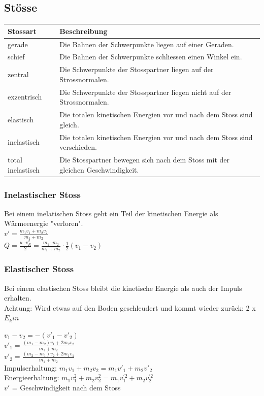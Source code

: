 \subsection{Stösse}

\begin{tabular}[c]{|l|l|}
	\hline
	Stossart & Beschreibung \\
	\hline
	gerade & Die Bahnen der Schwerpunkte liegen auf einer Geraden. \\
	\hline
	schief & Die Bahnen der Schwerpunkte schliessen einen Winkel ein. \\
	\hline
	zentral & Die Schwerpunkte der Stosspartner liegen auf der Strossnormalen.  \\
	\hline
	exzentrisch & Die Schwerpunkte der Stosspartner liegen nicht auf der Strossnormalen.  \\
	\hline
	elastisch & Die totalen kinetischen Energien vor und nach dem Stoss sind gleich.  \\
		\hline
	inelastisch & Die totalen kinetischen Energien vor und nach dem Stoss sind verschieden.  \\
	\hline
	total inelastisch & Die Stosspartner bewegen sich nach dem Stoss mit der gleichen Geschwindigkeit.  \\
	\hline
\end{tabular}

%

\subsubsection{Inelastischer Stoss}
Bei einem inelatischen Stoss geht ein Teil der kinetischen Energie als Wärmeenergie "verloren". \\
$v' = \frac{m_1v_1 + m_2v_2}{m_1 + m_2}$ \\
$Q = \frac{u \cdot v_{R}^2}{2} = \frac{m_1 \cdot m_2}{m_1 + m_2} \cdot \frac{1}{2}(v_1 - v_2) $

\subsubsection{Elastischer Stoss}
Bei einem elastischen Stoss bleibt die kinetische Energie als auch der Impuls erhalten. \\
Achtung: Wird etwas auf den Boden geschleudert und kommt wieder zurück: 2 x $E_kin$

$v_1 - v_2 = -(v'_1 - v'_2)$ \\
$v'_1 = \frac{(m_1 - m_2)v_1 + 2m_2v_2}{m_1 + m_2} $ \\
$v'_2 = \frac{(m_2 - m_1)v_2 + 2m_1v_1}{m_1 + m_2}$ \\
Impulserhaltung: $m_1v_1 + m_2v_2 = m_1v'_1 + m_2v'_2$ \\
Energieerhaltung: $m_1v_1^2 + m_2v^2_2 = m_1v_1^{'2} + m_2v_2^{'2}$ \\
$v'$ = Geschwindigkeit nach dem Stoss \\

